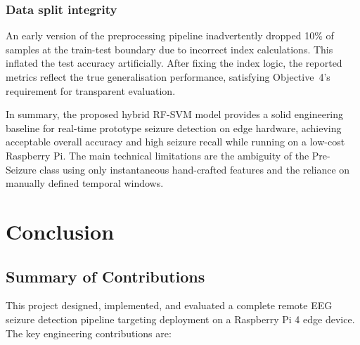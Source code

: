 \documentclass[12pt, a4paper]{report}
\begin{document}
\subsection*{Data split integrity}

An early version of the preprocessing pipeline inadvertently dropped 10\%
of samples at the train-test boundary due to incorrect index calculations.
This inflated the test accuracy artificially. After fixing the index logic,
the reported metrics reflect the true generalisation performance, satisfying
Objective~4's requirement for transparent evaluation.

In summary, the proposed hybrid RF-SVM model provides a solid engineering
baseline for real-time prototype seizure detection on edge hardware,
achieving acceptable overall accuracy and high seizure recall while running
on a low-cost Raspberry Pi. The main technical limitations are the
ambiguity of the Pre-Seizure class using only instantaneous hand-crafted
features and the reliance on manually defined temporal windows.

\chapter{Conclusion}

\section{Summary of Contributions}

This project designed, implemented, and evaluated a complete
remote EEG seizure detection pipeline targeting deployment on a Raspberry
Pi 4 edge device. The key engineering contributions are:
\end{document}
